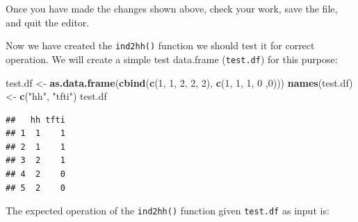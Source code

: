 \documentclass[12pt,a4paper]{book}
\newenvironment{Shaded}{\begin{snugshade}}{\end{snugshade}}
\newcommand{\DecValTok}[1]{\textcolor[rgb]{0.00,0.00,0.81}{#1}}
\newcommand{\KeywordTok}[1]{\textcolor[rgb]{0.13,0.29,0.53}{\textbf{#1}}}
\newcommand{\NormalTok}[1]{#1}
\newcommand{\StringTok}[1]{\textcolor[rgb]{0.31,0.60,0.02}{#1}}
\theoremstyle{definition}
\theoremstyle{definition}
\theoremstyle{definition}
\theoremstyle{remark}
\begin{document}
Once you have made the changes shown above, check your work, save the
file, and quit the editor.

Now we have created the \texttt{ind2hh()} function we should test it for
correct operation. We will create a simple test data.frame
(\texttt{test.df}) for this purpose:

\begin{Shaded}
\begin{Highlighting}[]
\NormalTok{test.df <-}\StringTok{ }\KeywordTok{as.data.frame}\NormalTok{(}\KeywordTok{cbind}\NormalTok{(}\KeywordTok{c}\NormalTok{(}\DecValTok{1}\NormalTok{, }\DecValTok{1}\NormalTok{, }\DecValTok{2}\NormalTok{, }\DecValTok{2}\NormalTok{, }\DecValTok{2}\NormalTok{),  }\KeywordTok{c}\NormalTok{(}\DecValTok{1}\NormalTok{, }\DecValTok{1}\NormalTok{, }\DecValTok{1}\NormalTok{, }\DecValTok{0}\NormalTok{ ,}\DecValTok{0}\NormalTok{)))}
\KeywordTok{names}\NormalTok{(test.df) <-}\StringTok{ }\KeywordTok{c}\NormalTok{(}\StringTok{"hh"}\NormalTok{, }\StringTok{"tfti"}\NormalTok{)}
\NormalTok{test.df}
\end{Highlighting}
\end{Shaded}

\begin{verbatim}
##   hh tfti
## 1  1    1
## 2  1    1
## 3  2    1
## 4  2    0
## 5  2    0
\end{verbatim}

The expected operation of the \texttt{ind2hh()} function given
\texttt{test.df} as input is:
\end{document}
